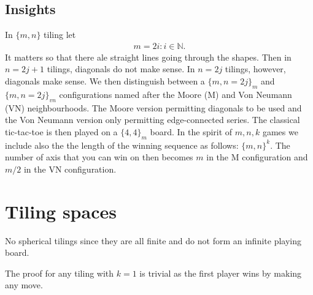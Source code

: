 \documentclass{article}
\newcommand{\N}{\mathbb{N}}
\begin{document}
        \subsection{Insights}
            In $\{m, n\}$ tiling let 
            \begin{align}
                m = 2i: i\in \N. \label{m_condition}
            \end{align}
            It matters so that there ale straight lines going through the shapes. Then in $n = 2j + 1$ tilings, diagonals do not make sense. In $n = 2j$ tilings, however, diagonals make sense. We then distinguish between a $\{m, n = 2j\}_m$ and $\{m, n = 2j\}_{vn}$ configurations named after the Moore (M) and Von Neumann (VN) neighbourhoods. The Moore version permitting diagonals to be used and the Von Neumann version only permitting edge-connected series. The classical tic-tac-toe is then played on a $\{4, 4\}_m$ board. In the spirit of $m,n,k$ games we include also the the length of the winning sequence as follows: $\{m, n\}^k$. The number of axis that you can win on then becomes $m$ in the M configuration and $m/2$ in the VN configuration.

    \section{Tiling spaces}
        No spherical tilings since they are all finite and do not form an infinite playing board.

        The proof for any tiling with $k = 1$ is trivial as the first player wins by making any move.
\end{document}
